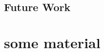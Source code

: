 \documentclass[mscthesis]{usiinfthesis}
\begin{document}
\section{Future Work}
\label{ch:conc_work}

\nocite{*}

\appendix %

\chapter{some material}

\backmatter


%
%
%
%
%

%

\printglossaries

\end{document}
